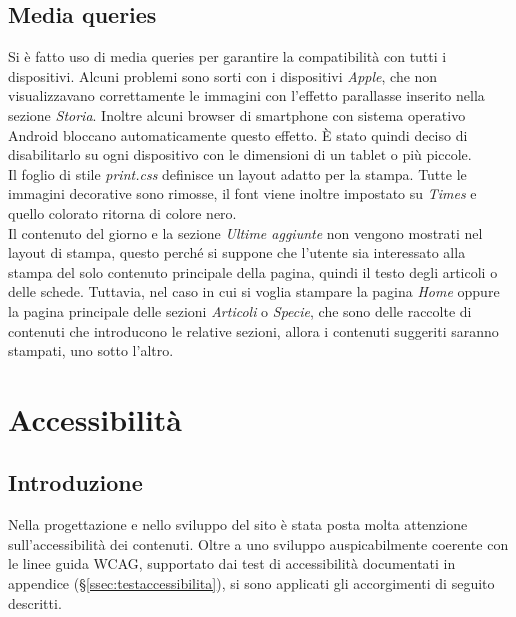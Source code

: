 \documentclass[12pt]{article}
\begin{document}
	\subsection{Media queries}
	Si è fatto uso di media queries per garantire la compatibilità con tutti i dispositivi. Alcuni problemi sono sorti con i dispositivi \textit{Apple}, che non visualizzavano correttamente le immagini con l'effetto parallasse inserito nella sezione \textit{Storia}. Inoltre alcuni browser di smartphone con sistema operativo Android bloccano automaticamente questo effetto. È stato quindi deciso di disabilitarlo su ogni dispositivo con le dimensioni di un tablet o più piccole.\\
	Il foglio di stile \textit{print.css} definisce un layout adatto per la stampa. Tutte le immagini decorative sono rimosse, il font viene inoltre impostato su \textit{Times} e quello colorato ritorna di colore nero.\\
	Il contenuto del giorno e la sezione \textit{Ultime aggiunte} non vengono mostrati nel layout di stampa, questo perché si suppone che l'utente sia interessato alla stampa del solo contenuto principale della pagina, quindi il testo degli articoli o delle schede. Tuttavia, nel caso in cui si voglia stampare la pagina \textit{Home} oppure la pagina principale delle sezioni \textit{Articoli} o \textit{Specie}, che sono delle raccolte di contenuti che introducono le relative sezioni, allora i contenuti suggeriti saranno stampati, uno sotto l'altro.

	\newpage
	\section{Accessibilità} \label{sec:accessibilita}
	\subsection{Introduzione}
	Nella progettazione e nello sviluppo del sito è stata posta molta attenzione sull'accessibilità dei contenuti. Oltre a uno sviluppo auspicabilmente coerente con le linee guida WCAG, supportato dai test di accessibilità documentati in appendice (§\ref{ssec:testaccessibilita}), si sono applicati gli accorgimenti di seguito descritti.
		
\end{document}
